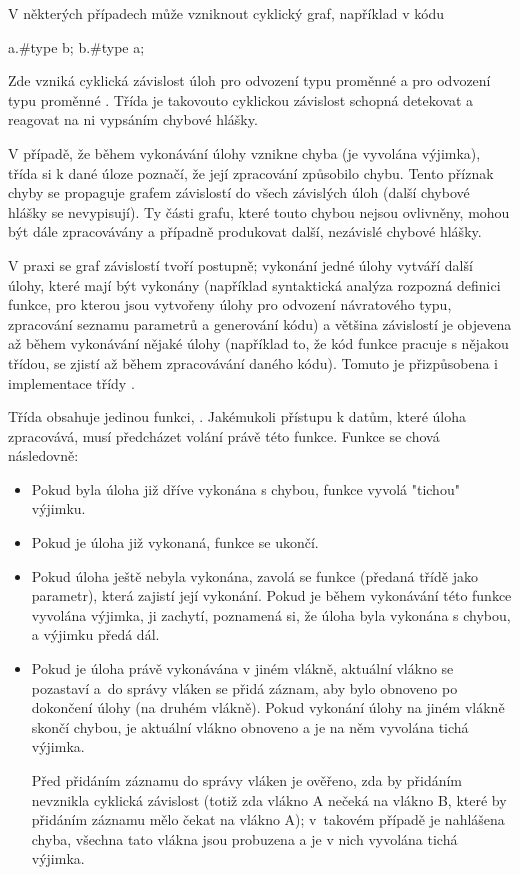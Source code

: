 
V některých případech může vzniknout cyklický graf, například v kódu

\begin{code}
a.#type b;
b.#type a;
\end{code}

Zde vzniká cyklická závislost úloh pro odvození typu proměnné  a pro odvození typu proměnné . Třída  je takovouto cyklickou závislost schopná detekovat a reagovat na ni vypsáním chybové hlášky.

V případě, že během vykonávání úlohy vznikne chyba (je vyvolána výjimka), třída  si k dané úloze poznačí, že její zpracování způsobilo chybu. Tento příznak chyby se propaguje grafem závislostí do všech závislých úloh (další chybové hlášky se nevypisují). Ty části grafu, které touto chybou nejsou ovlivněny, mohou být dále zpracovávány a případně produkovat další, nezávislé chybové hlášky.

V praxi se graf závislostí tvoří postupně; vykonání jedné úlohy vytváří další úlohy, které mají být vykonány (například syntaktická analýza rozpozná definici funkce, pro kterou jsou vytvořeny úlohy pro odvození návratového typu, zpracování seznamu parametrů a generování kódu) a většina závislostí je objevena až během vykonávání nějaké úlohy (například to, že kód funkce pracuje s nějakou třídou, se zjistí až během zpracovávání daného kódu). Tomuto je přizpůsobena i implementace třídy .

Třída obsahuje jedinou funkci, . Jakémukoli přístupu k datům, které úloha zpracovává, musí předcházet volání právě této funkce. Funkce se chová následovně:
\begin{itemize}
	\item Pokud byla úloha již dříve vykonána s chybou, funkce vyvolá "tichou" výjimku.
	\item Pokud je úloha již vykonaná, funkce se ukončí.
	\item Pokud úloha ještě nebyla vykonána, zavolá se funkce (předaná třídě  jako parametr), která zajistí její vykonání. Pokud je během vykonávání této funkce vyvolána výjimka,  ji zachytí, poznamená si, že úloha byla vykonána s chybou, a výjimku předá dál.
	\item Pokud je úloha právě vykonávána v jiném vlákně, aktuální vlákno se pozastaví a~do správy vláken se přidá záznam, aby bylo obnoveno po dokončení úlohy (na druhém vlákně). Pokud vykonání úlohy na jiném vlákně skončí chybou, je aktuální vlákno obnoveno a je na něm vyvolána tichá výjimka.
	
	Před přidáním záznamu do správy vláken je ověřeno, zda by přidáním nevznikla cyklická závislost (totiž zda vlákno A nečeká na vlákno B, které by přidáním záznamu mělo čekat na vlákno A); v~takovém případě je nahlášena chyba, všechna tato vlákna jsou probuzena a je v nich vyvolána tichá výjimka.
\end{itemize}


